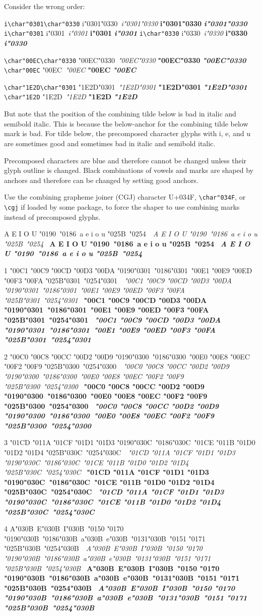 \documentclass[landscape]{article}
\newcommand{\PREC}[1]{{\color{supportedprec}#1}}
\newcommand{\ribbiline}[1]{#1\ 
	{\itshape #1}
	{\bfseries #1}
	{\itshape\bfseries #1}}
\newcommand{\cgj}{\char"034F }
\begin{document}
Consider the wrong order:

\verb|i\char"0301\char"0330| \ribbiline{i\char"0301\char"0330} \verb|i\char"0301| \ribbiline{i\char"0301} \verb|i\char"0330| \ribbiline{i\char"0330}

\verb|\char"00EC\char"0330|  \ribbiline{\char"00EC\char"0330} \verb|\char"00EC|  \ribbiline{\char"00EC} 

\verb|\char"1E2D\char"0301| \ribbiline{\char"1E2D\char"0301} \verb|\char"1E2D| \ribbiline{\char"1E2D}

But note that the position of the combining tilde below is bad in italic and semibold italic.
This is because the below-anchor for the combining tilde below mark is bad.
For tilde below, the precomposed character glyphs with i, e, and u 
are sometimes good and sometimes bad in italic and semibold italic.

Precomposed characters are blue and therefore cannot be changed unless their glyph outline is changed.
Black combinations of vowels and marks are shaped by anchors 
and therefore can be changed by setting good anchors.

Use the combining grapheme joiner (CGJ) character U+034F, \verb|\char"034F|, 
or \verb|\cgj| if loaded by some package, to force the shaper to use combining marks instead of precomposed glyphs.

\ribbiline{A E I O U \char"0190\ \char"0186\ a e i o u \char"025B\ \char"0254\ }

1 \ribbiline{\PREC{\char"00C1} \PREC{\char"00C9} \PREC{\char"00CD} \PREC{\char"00D3} \PREC{\char"00DA} \char"0190\char"0301\ \char"0186\char"0301\
\PREC{\char"00E1} \PREC{\char"00E9} \PREC{\char"00ED} \PREC{\char"00F3} \PREC{\char"00FA} \char"025B\char"0301\ \char"0254\char"0301\ }

2 \ribbiline{\PREC{\char"00C0} \PREC{\char"00C8} \PREC{\char"00CC} \PREC{\char"00D2} \PREC{\char"00D9} \char"0190\char"0300\ \char"0186\char"0300\
\PREC{\char"00E0} \PREC{\char"00E8} \PREC{\char"00EC} \PREC{\char"00F2} \PREC{\char"00F9} \char"025B\char"0300\ \char"0254\char"0300\ }

3 \ribbiline{\PREC{\char"01CD} \PREC{\char"011A} \PREC{\char"01CF} \PREC{\char"01D1} \PREC{\char"01D3} \char"0190\char"030C\ \char"0186\char"030C\
\PREC{\char"01CE} \PREC{\char"011B} \PREC{\char"01D0} \PREC{\char"01D2} \PREC{\char"01D4} \char"025B\char"030C\ \char"0254\char"030C\ }

4 \ribbiline{A\char"030B\ E\char"030B\ I\char"030B\ \PREC{\char"0150} \PREC{\char"0170} \char"0190\char"030B\ \char"0186\char"030B\
a\char"030B\ e\char"030B\ \char"0131\char"030B\ \PREC{\char"0151} \PREC{\char"0171} \char"025B\char"030B\ \char"0254\char"030B\ }
\end{document}
